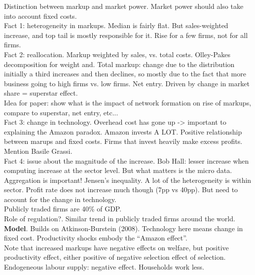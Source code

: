\documentclass{amsart}
\theoremstyle{definition}
\theoremstyle{remark}
\numberwithin{equation}{section}
\begin{document}
Distinction between markup and market power. Market power should also take into account fixed costs.\\

Fact 1: heterogeneity in markups. Median is fairly flat. But sales-weighted increase, and top tail is mostly responsible for it. Rise for a few firms, not for all firms.\\

Fact 2: reallocation. Markup weighted by sales, vs. total costs. Olley-Pakes decomposition for weight and. Total markup: change due to the distribution initially a third increases and then declines, so mostly due to the fact that more business going to high firms vs. low firms. Net entry. Driven by change in market share = superstar effect. \\

Idea for paper: show what is the impact of network formation on rise of markups, compare to superstar, net entry, etc...\\

Fact 3: change in technology. Overhead cost has gone up -> important to explaining the Amazon paradox. Amazon invests A LOT. Positive relationship between marups and fixed costs. Firms that invest heavily make excess profits.\\

Mention Basile Grassi.\\

Fact 4: issue about the magnitude of the increase. Bob Hall: lesser increase when computing increase at the sector level. But what matters is the micro data. Aggregation is important! Jensen's inequality. A lot of the heterogeneity is within sector. Profit rate does not increase much though (7pp vs 40pp). But need to account for the change in technology.\\

Publicly traded firms are 40\% of GDP.\\

Role of regulation?. Similar trend in publicly traded firms around the world. \\

\textbf{Model}. Builds on Atkinson-Burstein (2008). Technology here means change in fixed cost. Productivity shocks embody the ``Amazon effect''.\\

Note that increased markups have negative effects on welfare, but positive productivity effect, either positive of negative selection effect of selection. Endogeneous labour supply: negative effect. Households work less.\\
\end{document}
